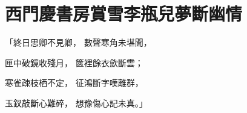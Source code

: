 %

\chapter{西門慶書房賞雪\KG 李瓶兒夢斷幽情}


\begin{showcontents}{}




「終日思卿不見卿，  數聲寒角未堪聞，

匣中破鏡收殘月，  篋裡餘衣歛斷雲；

寒雀疎枝栖不定，  征鴻斷字嘆離群，

玉釵敲斷心難碎，  想豫傷心記未真。」


\end{showcontents}
